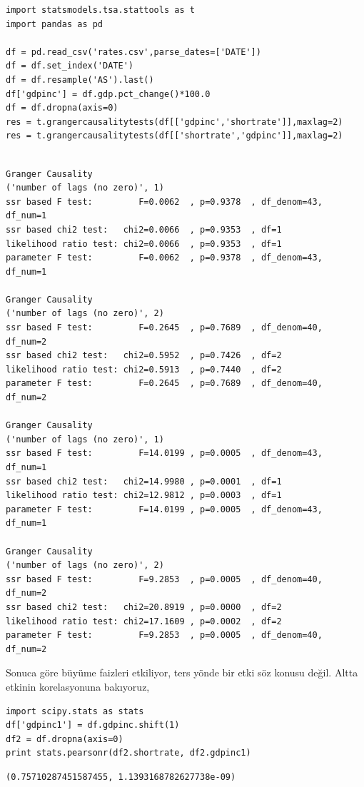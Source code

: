\documentclass[12pt,fleqn]{article}\usepackage{../../common}
\begin{document}
\begin{verbatim}
import statsmodels.tsa.stattools as t
import pandas as pd

df = pd.read_csv('rates.csv',parse_dates=['DATE'])
df = df.set_index('DATE')
df = df.resample('AS').last()
df['gdpinc'] = df.gdp.pct_change()*100.0
df = df.dropna(axis=0)
res = t.grangercausalitytests(df[['gdpinc','shortrate']],maxlag=2)
res = t.grangercausalitytests(df[['shortrate','gdpinc']],maxlag=2)
\end{verbatim}

\begin{verbatim}

Granger Causality
('number of lags (no zero)', 1)
ssr based F test:         F=0.0062  , p=0.9378  , df_denom=43, df_num=1
ssr based chi2 test:   chi2=0.0066  , p=0.9353  , df=1
likelihood ratio test: chi2=0.0066  , p=0.9353  , df=1
parameter F test:         F=0.0062  , p=0.9378  , df_denom=43, df_num=1

Granger Causality
('number of lags (no zero)', 2)
ssr based F test:         F=0.2645  , p=0.7689  , df_denom=40, df_num=2
ssr based chi2 test:   chi2=0.5952  , p=0.7426  , df=2
likelihood ratio test: chi2=0.5913  , p=0.7440  , df=2
parameter F test:         F=0.2645  , p=0.7689  , df_denom=40, df_num=2

Granger Causality
('number of lags (no zero)', 1)
ssr based F test:         F=14.0199 , p=0.0005  , df_denom=43, df_num=1
ssr based chi2 test:   chi2=14.9980 , p=0.0001  , df=1
likelihood ratio test: chi2=12.9812 , p=0.0003  , df=1
parameter F test:         F=14.0199 , p=0.0005  , df_denom=43, df_num=1

Granger Causality
('number of lags (no zero)', 2)
ssr based F test:         F=9.2853  , p=0.0005  , df_denom=40, df_num=2
ssr based chi2 test:   chi2=20.8919 , p=0.0000  , df=2
likelihood ratio test: chi2=17.1609 , p=0.0002  , df=2
parameter F test:         F=9.2853  , p=0.0005  , df_denom=40, df_num=2
\end{verbatim}

Sonuca göre büyüme faizleri etkiliyor, ters yönde bir etki söz konusu
değil. Altta etkinin korelasyonuna bakıyoruz,

\begin{verbatim}
import scipy.stats as stats
df['gdpinc1'] = df.gdpinc.shift(1)
df2 = df.dropna(axis=0)
print stats.pearsonr(df2.shortrate, df2.gdpinc1)
\end{verbatim}

\begin{verbatim}
(0.75710287451587455, 1.1393168782627738e-09)
\end{verbatim}
\end{document}
